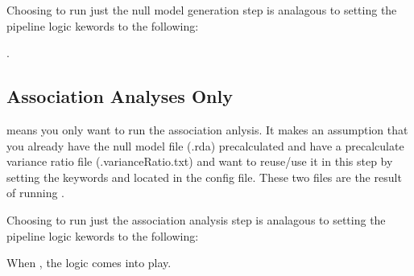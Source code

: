 \documentclass[letterpaper,10pt,english]{sphinxmanual}
\begin{document}
Choosing to run just the null model generation step is analagous to setting the pipeline logic kewords to the following:

\begin{sphinxVerbatim}[commandchars=\\\{\}]
\end{sphinxVerbatim}

        .


\subsection{Association Analyses Only}
\label{\detokenize{exampleWorkFlows:association-analyses-only}}
 means you only want to run the association anlysis.  It makes an assumption that you already have the null model file (.rda) pre\sphinxhyphen{}calculated and have a pre\sphinxhyphen{}calculate variance ratio file (.varianceRatio.txt) and want to re\sphinxhyphen{}use/use it in this step by setting the keywords  and  located in the config file.  These two files are the result of running .

Choosing to run just the association analysis step is analagous to setting the pipeline logic kewords to the following:

\begin{sphinxVerbatim}[commandchars=\\\{\}]
\end{sphinxVerbatim}

When , the  logic comes into play.
\end{document}
